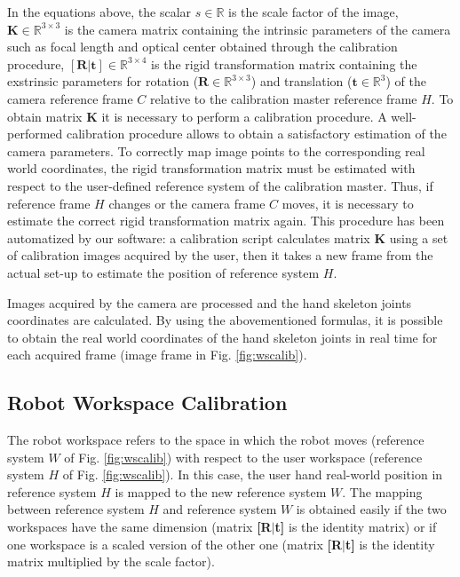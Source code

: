 \documentclass[a4paper, 10 pt, conference]{ieeeconf}      %
\begin{document}
In the equations above, the scalar $s\in\mathbb{R}$ is the scale factor of the image, $\mathbf{K}\in\mathbb{R}^{3\times3}$ is the camera matrix containing the intrinsic parameters of the camera such as focal length and optical center obtained through the calibration procedure, $\mathbf{[R|t]}\in\mathbb{R}^{3\times4}$ is the rigid transformation matrix containing the exstrinsic parameters for rotation ($\mathbf{R}\in\mathbb{R}^{3\times3}$) and translation ($\mathbf{t}\in\mathbb{R}^3$) of the camera reference frame $C$ relative to the calibration master reference frame $H$. 
To obtain matrix \textbf{K} it is necessary to perform a calibration procedure. A well-performed calibration procedure allows to obtain a satisfactory estimation of the camera parameters. To correctly map image points to the corresponding real world coordinates, the rigid transformation matrix must be estimated with respect to the user-defined reference system of the calibration master. Thus, if reference frame $H$ changes or the camera frame $C$ moves, it is necessary to estimate the correct rigid transformation matrix again. This procedure has been automatized by our software: a calibration script calculates matrix \textbf{K} using a set of calibration images acquired by the user, then it takes a new frame from the actual set-up to estimate the position of reference system $H$.

Images acquired by the camera are processed and the hand skeleton joints coordinates are calculated. By using the abovementioned formulas, it is possible to obtain the real world coordinates of the hand skeleton joints in real time for each acquired frame (image frame in Fig. \ref{fig:wscalib}).

\subsection{Robot Workspace Calibration}

The robot workspace refers to the space in which the robot moves (reference system $W$ of Fig. \ref{fig:wscalib}) with respect to the user workspace (reference system $H$ of Fig. \ref{fig:wscalib}). In this case, the user hand real-world position in reference system $H$ is mapped to the new reference system $W$. The mapping between reference system $H$ and reference system $W$ is obtained easily if the two workspaces have the same dimension (matrix \textbf{[R$|$t]} is the identity matrix) or if one workspace is a scaled version of the other one (matrix \textbf{[R$|$t]} is the identity matrix multiplied by the scale factor). %
\end{document}
